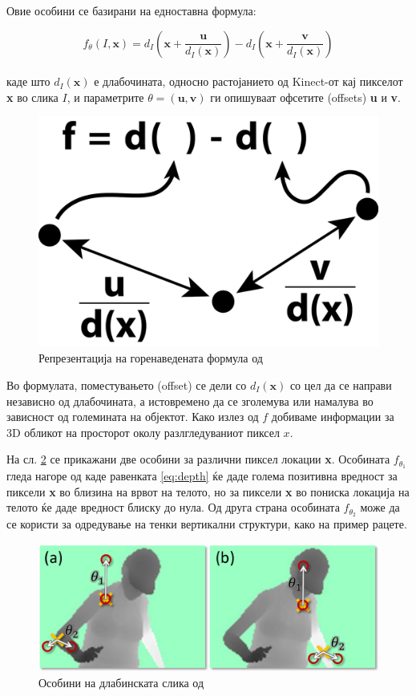 \documentclass[12pt]{article}
\begin{document}
	Овие особини се базирани на едноставна формула:

  \begin{equation} \label{eq:depth}
	  f_\theta(I,\textbf{x}) = d_I(\textbf{x}+\frac{\textbf{u}}{d_I(\textbf{x})}) - d_I(\textbf{x}+\frac{\textbf{v}}{d_I(\textbf{x})})
    \end{equation}
  \\
  каде што $d_I(\textbf{x})$ е длабочината, односно растојанието од Kinect-от кај пикселот \textbf{x} во слика $I$, и параметрите $\theta = (\textbf{u},\textbf{v})$ ги опишуваат офсетите (offsets) \textbf{u} и \textbf{v}.

  \begin{figure}[H]
	  \includegraphics[width=0.35\linewidth]{./images/kinectfeature.png}
		\centering
		\caption{Репрезентација на горенаведената формула од \cite{machinelearning}}
		\label{fig:kinectfeature.png}
	  \end{figure}

	Во формулата, поместувањето (offset) се дели со $d_I(\textbf{x})$ со цел да се направи независно од длабочината, а истовремено да се зголемува или намалува во зависност од големината на објектот. Како излез од $f$ добиваме информации за 3D обликот на просторот околу разлгледуваниот пиксел $x$.\bigbreak

  На сл. \ref{fig:depth_features.png} се прикажани две особини за различни пиксел локации \textbf{x}. Особината $f_{\theta_1}$ гледа нагоре од каде равенката \ref{eq:depth} ќе даде голема позитивна вредност за пиксели \textbf{x} во близина на врвот на телото, но за пиксели \textbf{x} во пониска локација на телото ќе даде вредност блиску до нула. Од друга страна особината $f_{\theta_2}$ може да се користи за одредување на тенки вертикални структури, како на пример рацете.

  \begin{figure}[H]
    \includegraphics[width=0.75\linewidth]{./images/depth_features.png}
    \centering
    \caption{Особини на длабинската слика од \cite{machinelearning}}
    \label{fig:depth_features.png}
    \end{figure}
\end{document}
